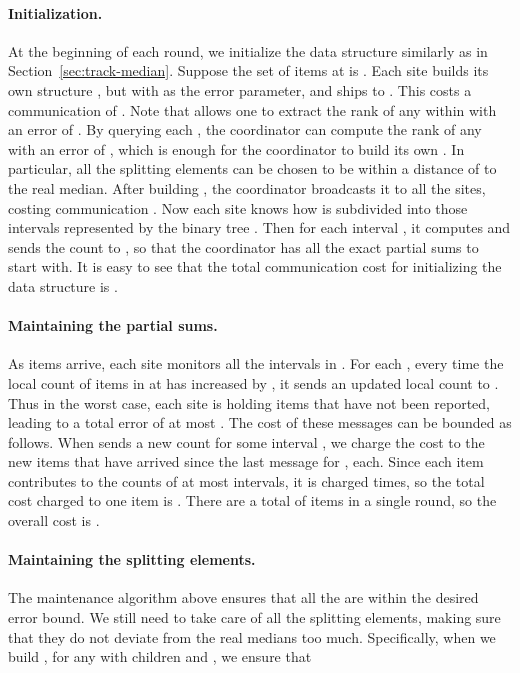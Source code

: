 \documentclass[10pt]{article}
\begin{document}
\paragraph{Initialization.}
At the beginning of each round, we initialize the data structure
similarly as in Section~\ref{sec:track-median}. Suppose the set of
items at  is . Each site  builds its own structure
, but with  as the error parameter, and ships to
.  This costs a communication of . Note that
 allows one to extract the rank of any  within 
with an error of . By querying each , the
coordinator can compute the rank of any  with an error of
, which is
enough for the coordinator to build its own .  In
particular, all the splitting elements can be chosen to be within
a distance of  to the real median. After
building , the coordinator broadcasts it to all the sites,
costing communication .  Now each site  knows how
 is subdivided into those  intervals represented by the
binary tree . Then for
each interval , it computes  and sends the count to
, so that the coordinator has all the exact partial sums 
to start with. It is easy to see that the total communication cost
for initializing the data structure is .

\paragraph{Maintaining the partial sums.}
As items arrive, each site  monitors all the intervals 
in . For each , every time the local count of items in
 at  has increased by , it sends an
updated local count to .  Thus in the worst case, each site is
holding  items that have not been reported,
leading to a total error of at most .  The cost of these
messages can be bounded as follows.  When  sends a new count
for some interval , we charge the cost to the 
new items that have arrived since the last message for ,  each.  Since each item contributes to the counts of
at most  intervals, it is charged  times, so the
total cost charged to one item is .
There are a total of  items in a single round, so the
overall cost is .

\paragraph{Maintaining the splitting elements.}
The maintenance algorithm above ensures that all the  are within the
desired error bound.  We still need to take care of all the splitting
elements, making sure that they do not deviate from the real medians too
much.  Specifically, when we build , for any  with children  and
, we ensure that
\end{document}
